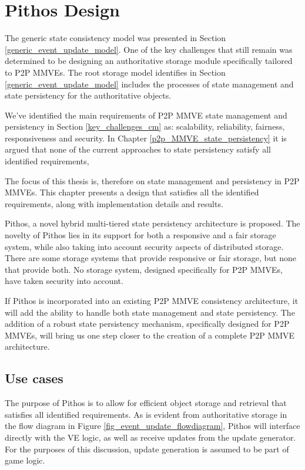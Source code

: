 \chapter{Pithos Design}
\label{chp:DESIGN}

The generic state consistency model was presented in Section \ref{generic_event_update_model}. One of the key challenges that still remain was determined to be designing an authoritative storage module specifically tailored to P2P MMVEs. The root storage model identifies in Section \ref{generic_event_update_model} includes the processes of state management and state persistency for the authoritative objects.

We've identified the main requirements of P2P MMVE state management and persistency in Section \ref{key_challenges_cm} as: scalability, reliability, fairness, responsiveness and security. In Chapter \ref{p2p_MMVE_state_persistency} it is argued that none of the current approaches to state persistency satisfy all identified requirements,

The focus of this thesis is, therefore on state management and persistency in P2P MMVEs. This chapter presents a design that satisfies all the identified requirements, along with implementation details and results.

Pithos, a novel hybrid multi-tiered state persistency architecture is proposed. The novelty of Pithos lies in its support for both a responsive and a fair storage system, while also taking into account security aspects
of distributed storage. There are some storage systems that provide responsive or fair storage, but none that provide both. No storage system, designed specifically for P2P MMVEs, have taken security into account.

If Pithos is incorporated into an existing P2P MMVE consistency architecture, it will add the ability to handle both state management and state persistency. The addition of a robust state persistency mechanism, specifically designed for P2P MMVEs, will bring us one step closer to the creation of a complete P2P MMVE architecture.

\section{Use cases}
\label{use_cases_goals}

The purpose of Pithos is to allow for efficient object storage and retrieval that satisfies all identified requirements. As is evident from authoritative storage in the flow diagram in Figure \ref{fig_event_update_flowdiagram}, Pithos will interface directly with the VE logic, as well as receive updates from the update generator. For the purposes of this discussion, update generation is assumed to be part of game logic.

